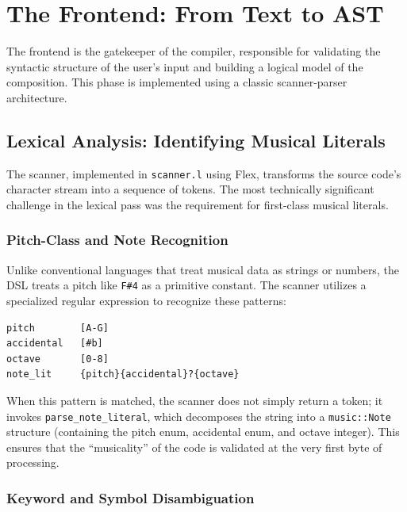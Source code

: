 \section{The Frontend: From Text to AST}\label{sec:implementation-frontend}

The frontend is the gatekeeper of the compiler, responsible for validating the syntactic structure of the user's input
and building a logical model of the composition.
This phase is implemented using a classic scanner-parser architecture.

\subsection{Lexical Analysis: Identifying Musical Literals}\label{subsec:lexical-analysis:-identifying-musical-literals}

The scanner, implemented in \texttt{scanner.l} using Flex, transforms the source code's character stream into a sequence
of tokens.
The most technically significant challenge in the lexical pass was the requirement for first-class musical literals.

\subsubsection{Pitch-Class and Note Recognition}

Unlike conventional languages that treat musical data as strings or numbers, the DSL treats a pitch like
\texttt{F\#4} as
a primitive constant.
The scanner utilizes a specialized regular expression to recognize these patterns:
\begin{lstlisting}[caption={Flex regular expression for note literal recognition.},label={lst:lstlisting}]
pitch        [A-G]
accidental   [#b]
octave       [0-8]
note_lit     {pitch}{accidental}?{octave}
\end{lstlisting}

When this pattern is matched, the scanner does not simply return a token; it invokes
\texttt{parse\_note\_literal}, which
decomposes the string into a \texttt{music::Note} structure (containing the pitch enum, accidental enum, and octave
integer).
This ensures that the ``musicality'' of the code is validated at the very first byte of processing.

\subsubsection{Keyword and Symbol Disambiguation}

